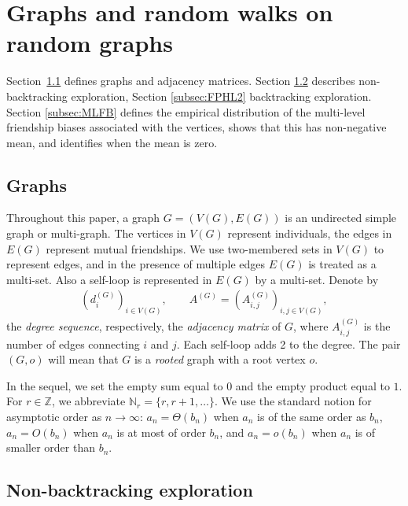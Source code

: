 \documentclass[11pt]{article}
\numberwithin{equation}{section}
\theoremstyle{plain}
\newcommand{\Z}{\mathbb Z}
\newcommand{\N}{\mathbb N}
\begin{document}

\section{Graphs and random walks on random graphs}
\label{sec:RWRG}

Section~\ref{subsec:graphs} defines graphs and adjacency matrices. Section \ref{subsec:FPHL} describes non-backtracking exploration, Section \ref{subsec:FPHL2} backtracking exploration. Section \ref{subsec:MLFB} defines the empirical distribution of the multi-level friendship biases associated with the vertices, shows that this has non-negative mean, and identifies when the mean is zero. 


\subsection{Graphs}
\label{subsec:graphs}

Throughout this paper, a graph $G = (V(G),E(G))$ is an undirected simple graph or multi-graph. The vertices in $V(G)$ represent individuals, the edges in $E(G)$ represent mutual friendships. We use two-membered sets in $V(G)$ to represent edges, and in the presence of multiple edges $E(G)$ is treated as a multi-set. Also a self-loop is represented in $E(G)$ by a multi-set. Denote by
\begin{align*}
(d_{i}^{(G)})_{i \in V(G)}, \qquad A^{(G)} = (A_{i,j}^{(G)})_{i,j\in V(G)},
\end{align*}
the \emph{degree sequence}, respectively, the \emph{adjacency matrix} of $G$, where $A_{i,j}^{(G)}$ is the number of edges connecting $i$ and $j$. Each self-loop adds 2 to the degree. The pair $(G,o)$ will mean that $G$ is a \emph{rooted} graph with a root vertex $o$.

In the sequel, we set the empty sum equal to $0$ and the empty product equal to $1$. For $r \in \Z$, we abbreviate $\N_r = \{r,r+1,\ldots\}$. We use the standard notion for asymptotic order as $n\to\infty$: $a_n = \Theta(b_n)$ when $a_n$ is of the same order as $b_n$, $a_n = O(b_n)$ when $a_n$ is at most of order $b_n$, and $a_n = o(b_n)$ when $a_n$ is of smaller order than $b_n$. 


\subsection{Non-backtracking exploration}
\label{subsec:FPHL}
\end{document}
